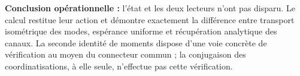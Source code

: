 \textbf{Conclusion opérationnelle :} l'état et les deux lecteurs n'ont pas disparu. Le calcul restitue leur action et démontre exactement la différence entre transport isométrique des modes, espérance uniforme et récupération analytique des canaux. La seconde identité de moments dispose d'une voie concrète de vérification au moyen du connecteur commun ; la conjugaison des coordinatisations, à elle seule, n'effectue pas cette vérification.
